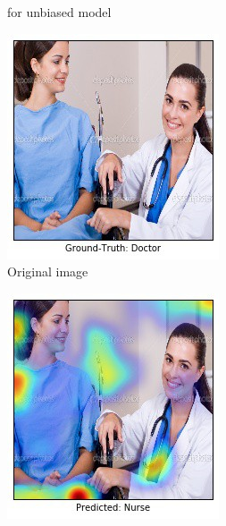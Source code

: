 \begin{figure}[ht!]
\begin{center}
\begin{subfigure}[b]{0.32\linewidth}
		\caption{\tiny{\gcam{} for unbiased model}}
        \vspace{10pt}
    \end{subfigure}
    \begin{subfigure}[b]{0.32\linewidth}
        \centering
        \includegraphics[width=1\linewidth]{figures/teaser/25_orig_balanced.jpg}
		\caption{\tiny{Original image}}
        \vspace{10pt}
    \end{subfigure}
    \begin{subfigure}[b]{0.32\linewidth}
        \centering
        \includegraphics[width=1\linewidth]{figures/teaser/25_gcam_incorr_unbalanced.jpg}

\end{subfigure}
\end{center}
\end{figure}
